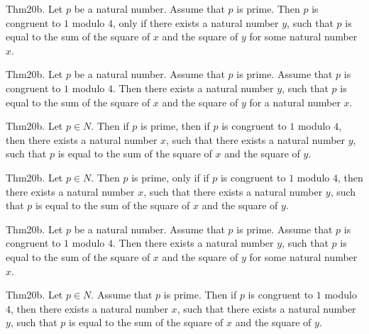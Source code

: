 \documentclass{article}
\begin{document}
Thm20b. Let $p$ be a natural number. Assume that $p$ is prime. Then $p$ is congruent to $1$ modulo $4$, only if there exists a natural number $y$, such that $p$ is equal to the sum of the square of $x$ and the square of $y$ for some natural number $x$.

Thm20b. Let $p$ be a natural number. Assume that $p$ is prime. Assume that $p$ is congruent to $1$ modulo $4$. Then there exists a natural number $y$, such that $p$ is equal to the sum of the square of $x$ and the square of $y$ for a natural number $x$.

Thm20b. Let $p \in N$. Then if $p$ is prime, then if $p$ is congruent to $1$ modulo $4$, then there exists a natural number $x$, such that there exists a natural number $y$, such that $p$ is equal to the sum of the square of $x$ and the square of $y$.

Thm20b. Let $p \in N$. Then $p$ is prime, only if if $p$ is congruent to $1$ modulo $4$, then there exists a natural number $x$, such that there exists a natural number $y$, such that $p$ is equal to the sum of the square of $x$ and the square of $y$.

Thm20b. Let $p$ be a natural number. Assume that $p$ is prime. Assume that $p$ is congruent to $1$ modulo $4$. Then there exists a natural number $y$, such that $p$ is equal to the sum of the square of $x$ and the square of $y$ for some natural number $x$.

Thm20b. Let $p \in N$. Assume that $p$ is prime. Then if $p$ is congruent to $1$ modulo $4$, then there exists a natural number $x$, such that there exists a natural number $y$, such that $p$ is equal to the sum of the square of $x$ and the square of $y$.
\end{document}
